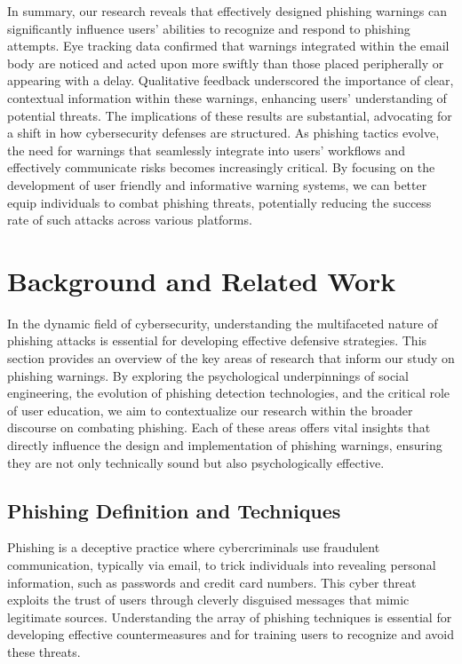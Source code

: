 \documentclass[
  a4paper,  %
  twoside,  %
  bibliography=totoc,
  headsepline,
  cleardoublepage=empty,
  parskip=half,
  draft=false
]{scrbook}
\begin{document}
In summary, our research reveals that effectively designed phishing warnings can significantly influence users' abilities to recognize and respond to phishing attempts. Eye tracking data confirmed that warnings integrated within the email body are noticed and acted upon more swiftly than those placed peripherally or appearing with a delay. Qualitative feedback underscored the importance of clear, contextual information within these warnings, enhancing users' understanding of potential threats. \newline
The implications of these results are substantial, advocating for a shift in how cybersecurity defenses are structured. As phishing tactics evolve, the need for warnings that seamlessly integrate into users' workflows and effectively communicate risks becomes increasingly critical. By focusing on the development of user friendly and informative warning systems, we can better equip individuals to combat phishing threats, potentially reducing the success rate of such attacks across various platforms. 


\chapter{Background and Related Work}
\label{sec:relatedwork}

In the dynamic field of cybersecurity, understanding the multifaceted nature of phishing attacks is essential for developing effective defensive strategies. This section provides an overview of the key areas of research that inform our study on phishing warnings. By exploring the psychological underpinnings of social engineering, the evolution of phishing detection technologies, and the critical role of user education, we aim to contextualize our research within the broader discourse on combating phishing. Each of these areas offers vital insights that directly influence the design and implementation of phishing warnings, ensuring they are not only technically sound but also psychologically effective.

\section{Phishing Definition and Techniques}
Phishing is a deceptive practice where cybercriminals use fraudulent communication, typically via email, to trick individuals into revealing personal information, such as passwords and credit card numbers. This cyber threat exploits the trust of users through cleverly disguised messages that mimic legitimate sources. Understanding the array of phishing techniques is essential for developing effective countermeasures and for training users to recognize and avoid these threats.
\end{document}
